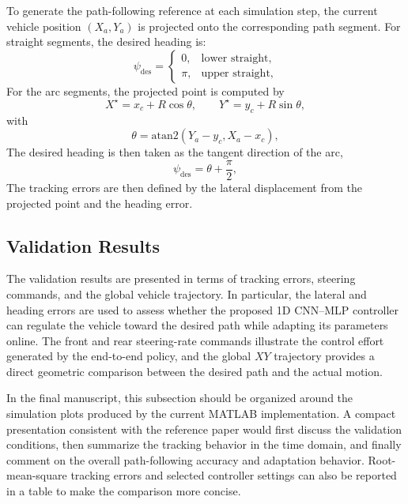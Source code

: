 \documentclass[conference]{IEEEtran}
\begin{document}
To generate the path-following reference at each simulation step, the current vehicle position $(X_a,Y_a)$ is projected onto the corresponding path segment. For straight segments, the desired heading is:
\begin{equation}
    \psi_{\mathrm{des}}
     =
    \begin{cases}
        0, & \text{lower straight},\\
        \pi, & \text{upper straight}
        ,
    \end{cases}
\end{equation}
For the arc segments, the projected point is computed by
\begin{equation}
    X^{\star} 
    = 
    x_c + R\cos\theta, \qquad
    Y^{\star} 
    = 
    y_c + R\sin\theta
    ,
\end{equation}
with
\begin{equation}
    \theta 
    = 
    \mathrm{atan2}(Y_a-y_c, X_a-x_c)
    ,
\end{equation}
The desired heading is then taken as the tangent direction of the arc,
\begin{equation}
    \psi_{\mathrm{des}} 
    = 
    \theta + \frac{\pi}{2}
    ,
\end{equation}
The tracking errors are then defined by the lateral displacement from the projected point and the heading error.

\subsection{Validation Results}
The validation results are presented in terms of tracking errors, steering commands, and the global vehicle trajectory. In particular, the lateral and heading errors are used to assess whether the proposed 1D CNN--MLP controller can regulate the vehicle toward the desired path while adapting its parameters online. The front and rear steering-rate commands illustrate the control effort generated by the end-to-end policy, and the global $XY$ trajectory provides a direct geometric comparison between the desired path and the actual motion.

In the final manuscript, this subsection should be organized around the simulation plots produced by the current MATLAB implementation. A compact presentation consistent with the reference paper would first discuss the validation conditions, then summarize the tracking behavior in the time domain, and finally comment on the overall path-following accuracy and adaptation behavior. Root-mean-square tracking errors and selected controller settings can also be reported in a table to make the comparison more concise.
\end{document}

